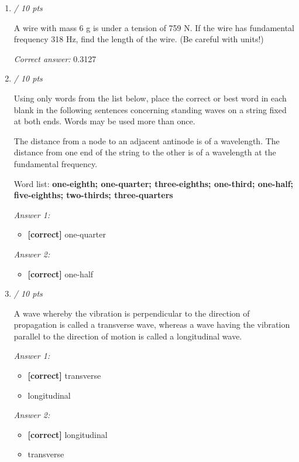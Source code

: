 \documentclass[11pt]{article}
\begin{document}
\begin{enumerate}[leftmargin=*,label=\textbf{Question \arabic*.}]
A wire with mass 0.066 kg and length 0.4 m has a fundamental frequency of 107 Hz. Calculate the tension in the wire in Newtons.

\textit{Correct answer: } 1,209

\item \hfill \textit{/ 10 pts}

A wire with mass 6 g is under a tension of 759 N. If the wire has fundamental frequency 318 Hz, find the length of the wire. (Be careful with units!)

\textit{Correct answer: } 0.3127

\item \hfill \textit{/ 10 pts}

Using only words from the list below, place the correct or best word in each blank in the following sentences concerning standing waves on a string fixed at both ends. Words may be used more than once.

The distance from a node to an adjacent antinode is
 of a wavelength. The distance from one end of the string to the other is
 of a wavelength at the fundamental frequency.

Word list:\textbf{ one-eighth; one-quarter; three-eighths; one-third; one-half; five-eighths; two-thirds; three-quarters}

\textit{Answer 1:}
\begin{itemize}
  \item \textbf{[correct]} one-quarter
\end{itemize}
\textit{Answer 2:}
\begin{itemize}
  \item \textbf{[correct]} one-half
\end{itemize}

\item \hfill \textit{/ 10 pts}

A wave whereby the vibration is perpendicular to the direction of propagation is called a transverse
 wave, whereas a wave having the vibration parallel to the direction of motion is called a longitudinal
 wave.

\textit{Answer 1:}
\begin{itemize}
  \item \textbf{[correct]} transverse
  \item longitudinal
\end{itemize}
\textit{Answer 2:}
\begin{itemize}
  \item \textbf{[correct]} longitudinal
  \item transverse
\end{itemize}


\end{enumerate}
\end{document}
